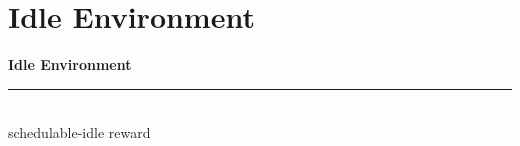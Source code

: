 
\section{Idle Environment}

\begin{frame}[plain]
  \vfill
  \begin{center}
    {\Huge\bfseries\color{DeepBlue} Idle Environment}\\[0.6em]
    {\color{SkyBlue}\rule{0.40\linewidth}{1.4pt}}\\[0.7em]
    {\large\color{DeepBlue!80!black} schedulable-idle reward}
  \end{center}
  \vfill
\end{frame}

